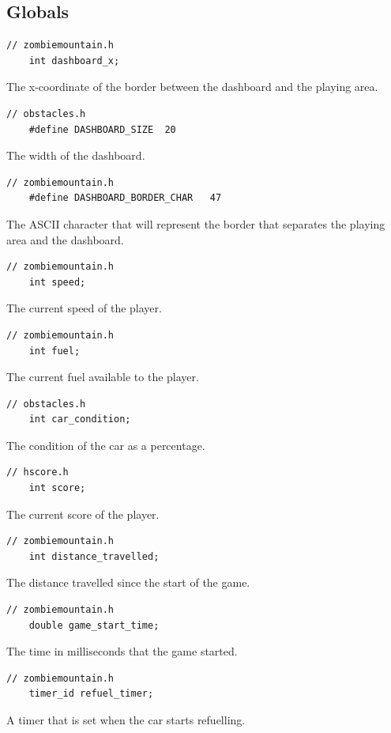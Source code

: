 \documentclass{article}
\begin{document}
\subsection*{Globals}
\begin{lstlisting}[style=CStyle]
	// zombiemountain.h
	int dashboard_x;
\end{lstlisting}
The x-coordinate of the border between the dashboard and the playing area.
\begin{lstlisting}[style=CStyle]
	// obstacles.h
	#define DASHBOARD_SIZE	20
\end{lstlisting}
The width of the dashboard.
\begin{lstlisting}[style=CStyle]
	// zombiemountain.h
	#define DASHBOARD_BORDER_CHAR	47
\end{lstlisting}
The ASCII character that will represent the border that separates the playing area and the dashboard.
\begin{lstlisting}[style=CStyle]
	// zombiemountain.h
	int speed;
\end{lstlisting}
The current speed of the player.
\begin{lstlisting}[style=CStyle]
	// zombiemountain.h
	int fuel;
\end{lstlisting}
The current fuel available to the player.
\begin{lstlisting}[style=CStyle]
	// obstacles.h
	int car_condition;
\end{lstlisting}
The condition of the car as a percentage.
\begin{lstlisting}[style=CStyle]
	// hscore.h
	int score;
\end{lstlisting}
The current score of the player.
\begin{lstlisting}[style=CStyle]
	// zombiemountain.h
	int distance_travelled;
\end{lstlisting}
The distance travelled since the start of the game.
\begin{lstlisting}[style=CStyle]
	// zombiemountain.h
	double game_start_time;
\end{lstlisting}
The time in milliseconds that the game started.
\begin{lstlisting}[style=CStyle]
	// zombiemountain.h
	timer_id refuel_timer;
\end{lstlisting}
A timer that is set when the car starts refuelling.
\newline
\end{document}
